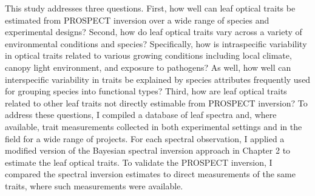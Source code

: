 This study addresses three questions.
% 
% 
% 
% 
% 
First, how well can leaf optical traits be estimated from PROSPECT inversion over a wide range of species and experimental designs?
% 
% 
Second, how do leaf optical traits vary across a variety of environmental conditions and species?
Specifically, how is intraspecific variability in optical traits related to various growing conditions including local climate, canopy light environment, and exposure to pathogens?
As well, how well can interspecific variability in traits be explained by species attributes frequently used for grouping species into functional types? 
Third, how are leaf optical traits related to other leaf traits not directly estimable from PROSPECT inversion?
To address these questions, I compiled a database of leaf spectra and, where available, trait measurements collected in both experimental settings and in the field for a wide range of projects.
For each spectral observation, I applied a modified version of the Bayesian spectral inversion approach in Chapter 2 to estimate the leaf optical traits.
To validate the PROSPECT inversion, I compared the spectral inversion estimates to direct measurements of the same traits, where such measurements were available.
